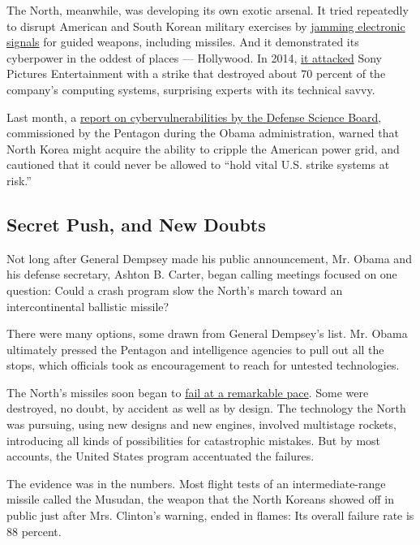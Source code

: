 The North, meanwhile, was developing its own exotic arsenal. It tried
repeatedly to disrupt American and South Korean military exercises by
\href{http://www.upi.com/North-Korea-jams-Souths-guided-missiles/49341299621609/}{jamming
electronic signals} for guided weapons, including missiles. And it
demonstrated its cyberpower in the oddest of places --- Hollywood. In
2014,
\href{https://www.nytimes.com/2014/12/18/world/asia/us-links-north-korea-to-sony-hacking.html?_r=0}{it
attacked} Sony Pictures Entertainment with a strike that destroyed about
70 percent of the company's computing systems, surprising experts with
its technical savvy.

Last month, a
\href{http://www.acq.osd.mil/dsb/reports/2010s/DSB-CyberDeterrenceReport_02-28-17_Final.pdf}{report
on cybervulnerabilities by the Defense Science Board}, commissioned by
the Pentagon during the Obama administration, warned that North Korea
might acquire the ability to cripple the American power grid, and
cautioned that it could never be allowed to ``hold vital U.S. strike
systems at risk.''

\hypertarget{secret-push-and-new-doubts}{%
\subsection{Secret Push, and New
Doubts}\label{secret-push-and-new-doubts}}

Not long after General Dempsey made his public announcement, Mr. Obama
and his defense secretary, Ashton B. Carter, began calling meetings
focused on one question: Could a crash program slow the North's march
toward an intercontinental ballistic missile?

There were many options, some drawn from General Dempsey's list. Mr.
Obama ultimately pressed the Pentagon and intelligence agencies to pull
out all the stops, which officials took as encouragement to reach for
untested technologies.

The North's missiles soon began to
\href{http://www.globalsecurity.org/wmd/world/dprk/nd-b5.htm}{fail at a
remarkable pace}. Some were destroyed, no doubt, by accident as well as
by design. The technology the North was pursuing, using new designs and
new engines, involved multistage rockets, introducing all kinds of
possibilities for catastrophic mistakes. But by most accounts, the
United States program accentuated the failures.

The evidence was in the numbers. Most flight tests of an
intermediate-range missile called the Musudan, the weapon that the North
Koreans showed off in public just after Mrs. Clinton's warning, ended in
flames: Its overall failure rate is 88 percent.

